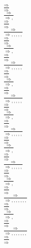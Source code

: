 \documentclass[11pt]{article}
\begin{document}
\begin{center}
\bigskip
\\$\frac{\Rightarrow }{\Rightarrow }$
\bigskip
\\$\frac{\Rightarrow }{\Rightarrow , }$
\bigskip
\\$\frac{\Rightarrow }{\Rightarrow }$
\bigskip
\\$\frac{\Rightarrow }{\Rightarrow , , , , , }$
\bigskip
\\$\frac{\Rightarrow }{\Rightarrow }$
\bigskip
\\$\frac{\Rightarrow }{\Rightarrow , }$
\bigskip
\\$\frac{\Rightarrow }{\Rightarrow }$
\bigskip
\\$\frac{\Rightarrow }{\Rightarrow , , , , , }$
\bigskip
\\$\frac{\Rightarrow }{\Rightarrow }$
\bigskip
\\$\frac{\Rightarrow }{\Rightarrow , }$
\bigskip
\\$\frac{\Rightarrow }{\Rightarrow }$
\bigskip
\\$\frac{\Rightarrow }{\Rightarrow , , , , , }$
\bigskip
\\$\frac{\Rightarrow }{\Rightarrow }$
\bigskip
\\$\frac{\Rightarrow }{\Rightarrow , }$
\bigskip
\\$\frac{\Rightarrow }{\Rightarrow }$
\bigskip
\\$\frac{\Rightarrow }{\Rightarrow , , , , , }$
\bigskip
\\$\frac{\Rightarrow }{\Rightarrow }$
\bigskip
\\$\frac{\Rightarrow }{\Rightarrow , }$
\bigskip
\\$\frac{\Rightarrow }{\Rightarrow }$
\bigskip
\\$\frac{\Rightarrow }{\Rightarrow , , , , , }$
\bigskip
\\$\frac{\Rightarrow }{\Rightarrow }$
\bigskip
\\$\frac{\Rightarrow }{\Rightarrow , }$
\bigskip
\\$\frac{\Rightarrow }{\Rightarrow }$
\bigskip
\\$\frac{\Rightarrow }{\Rightarrow , , , , , , , }$
\bigskip
\\$\frac{\Rightarrow }{\Rightarrow }$
\bigskip
\\$\frac{\Rightarrow }{\Rightarrow , }$
\bigskip
\\$\frac{\Rightarrow }{\Rightarrow }$
\bigskip
\\$\frac{\Rightarrow }{\Rightarrow , , , , , , , }$
\bigskip
\\$\frac{\Rightarrow }{\Rightarrow }$

\end{center}
\end{document}
